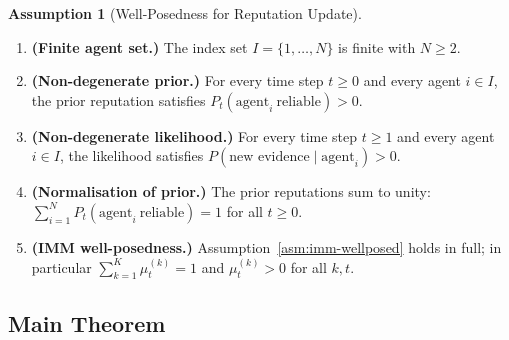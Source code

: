 \documentclass[12pt,openany]{book}
\numberwithin{equation}{chapter}
\theoremstyle{plain}
\theoremstyle{definition}
\newtheorem{assumption}[theorem]{Assumption}
\theoremstyle{remark}
\def\mathcal#1{#1}%
\begin{document}
\begin{assumption}[Well-Posedness for Reputation Update]
\label{asm:reputation-wellposed}
\begin{enumerate}
  \item \textbf{(Finite agent set.)}
        The index set $\mathcal{I} = \{1,\ldots,N\}$ is finite
        with $N \geq 2$.
  \item \textbf{(Non-degenerate prior.)}
        For every time step $t \geq 0$ and every agent $i \in
        \mathcal{I}$, the prior reputation satisfies
        $P_t(\text{agent}_i\ \text{reliable}) > 0$.
  \item \textbf{(Non-degenerate likelihood.)}
        For every time step $t \geq 1$ and every agent $i \in
        \mathcal{I}$, the likelihood satisfies
        $P(\text{new evidence} \mid \text{agent}_i) > 0$.
  \item \textbf{(Normalisation of prior.)}
        The prior reputations sum to unity:
        $\sum_{i=1}^{N} P_t(\text{agent}_i\ \text{reliable}) = 1$
        for all $t \geq 0$.
  \item \textbf{(IMM well-posedness.)}
        Assumption~\ref{asm:imm-wellposed} holds in full; in
        particular $\sum_{k=1}^{K}\mu_t^{(k)}=1$ and
        $\mu_t^{(k)}>0$ for all $k,t$.
\end{enumerate}
\end{assumption}

\subsection{Main Theorem}
\end{document}
